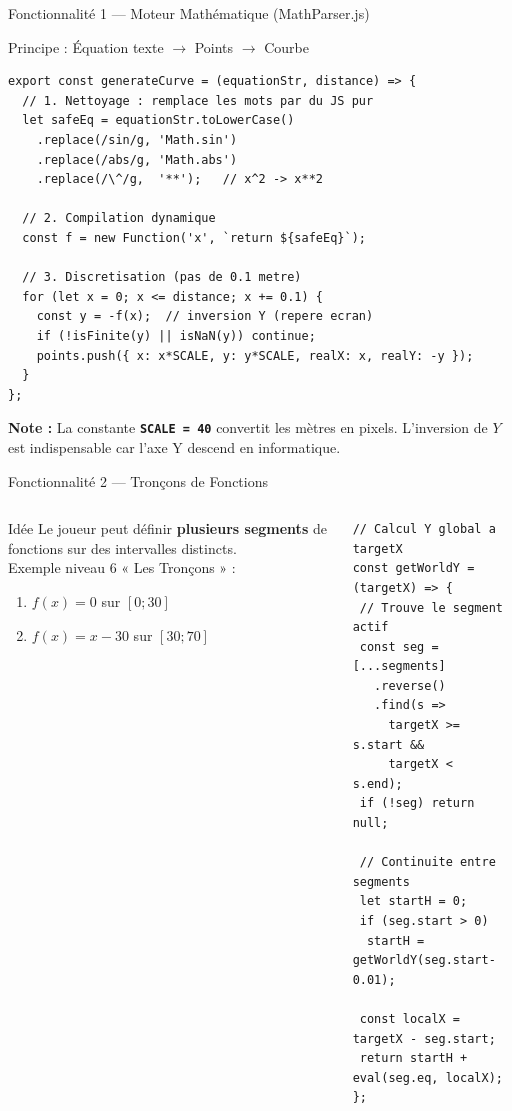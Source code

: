 \documentclass[aspectratio=169,12pt]{beamer}
\newcommand{\tech}[1]{\textcolor{mycyan}{\textbf{\texttt{#1}}}}
\begin{document}
\begin{frame}{Fonctionnalit\'e 1 --- Moteur Math\'ematique (MathParser.js)}
  \begin{block}{Principe : \'Equation texte $\rightarrow$ Points $\rightarrow$ Courbe}
  \end{block}
\begin{lstlisting}
export const generateCurve = (equationStr, distance) => {
  // 1. Nettoyage : remplace les mots par du JS pur
  let safeEq = equationStr.toLowerCase()
    .replace(/sin/g, 'Math.sin')
    .replace(/abs/g, 'Math.abs')
    .replace(/\^/g,  '**');   // x^2 -> x**2

  // 2. Compilation dynamique
  const f = new Function('x', `return ${safeEq}`);

  // 3. Discretisation (pas de 0.1 metre)
  for (let x = 0; x <= distance; x += 0.1) {
    const y = -f(x);  // inversion Y (repere ecran)
    if (!isFinite(y) || isNaN(y)) continue;
    points.push({ x: x*SCALE, y: y*SCALE, realX: x, realY: -y });
  }
};
\end{lstlisting}
  \vspace{0.2cm}
  \textcolor{myyellow}{\textbf{Note :}} La constante \tech{SCALE = 40} convertit les m\`etres en pixels.
  L'inversion de $Y$ est indispensable car l'axe Y descend en informatique.
\end{frame}

\begin{frame}{Fonctionnalit\'e 2 --- Tron\c{c}ons de Fonctions}
  \begin{columns}
    \begin{block}{Idée}
      Le joueur peut d\'efinir \textbf{plusieurs segments} de fonctions
      sur des intervalles distincts.\\[0.4cm]
      Exemple niveau 6 « Les Tron\c{c}ons » :\\
      \begin{enumerate}
        \item $f(x) = 0$ sur $[0 ; 30]$
        \item $f(x) = x - 30$ sur $[30 ; 70]$
      \end{enumerate}
    \end{block}
\begin{lstlisting}
// Calcul Y global a targetX
const getWorldY = (targetX) => {
 // Trouve le segment actif
 const seg = [...segments]
   .reverse()
   .find(s =>
     targetX >= s.start &&
     targetX <  s.end);
 if (!seg) return null;

 // Continuite entre segments
 let startH = 0;
 if (seg.start > 0)
  startH = getWorldY(seg.start-0.01);

 const localX = targetX - seg.start;
 return startH + eval(seg.eq, localX);
};
\end{lstlisting}
  \end{columns}
\end{frame}
\end{document}
